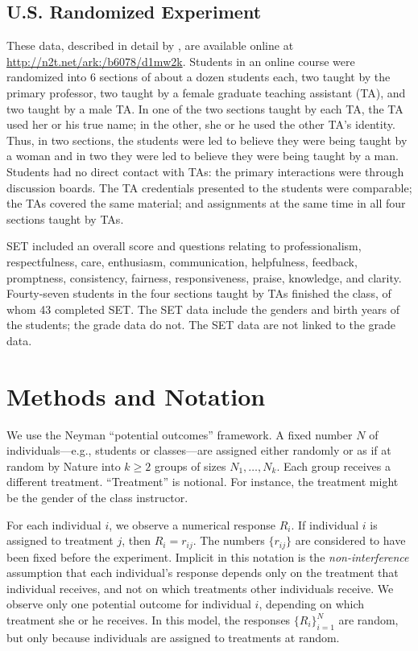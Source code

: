 \documentclass[12pt]{article}
\begin{document}
\subsection{U.S. Randomized Experiment}
These data, described in detail by \cite{MacNell2014}, are available online at 
\url{http://n2t.net/ark:/b6078/d1mw2k}.
Students in an online course were randomized into 6 sections of about a dozen students each, 
two taught by the primary professor,
two taught by a female graduate teaching assistant (TA), and two taught by a male TA.
In one of the two sections taught by each TA, the TA used her or his
true name; in the other, she or he used the other TA's identity.
Thus, in two sections, the students were led to believe they were being taught by a woman
and in two they were led to believe they were being taught by a man.
Students had no direct contact with TAs: the primary interactions were through
discussion boards.
The TA credentials presented to the students were comparable; the TAs covered
the same material; and assignments at the same time in all four sections taught by TAs.

SET included an overall score and questions relating to
professionalism, respectfulness, care, enthusiasm, communication, helpfulness,
feedback, promptness, consistency, fairness, responsiveness, praise, knowledge, 
and clarity.
Fourty-seven students in the four sections taught by TAs finished the class,
of whom 43 completed SET.
The SET data include the genders and birth years of the students; the grade data do not.
The SET data are not linked to the grade data.

\section{Methods and Notation} \label{sec:methods}

We use the Neyman ``potential outcomes'' framework.
A fixed number $N$ of individuals---e.g., students or classes---are assigned either
randomly or as if at random by Nature into 
$k \ge 2$ groups of sizes $N_1, \ldots, N_k$.
Each group receives a different treatment.
``Treatment'' is notional. 
For instance, the treatment might be the gender of the
class instructor.

For each individual $i$, we observe a numerical response $R_i$.
If individual $i$ is assigned to treatment $j$, then $R_i = r_{ij}$.
The numbers $\{r_{ij}\}$ are considered to have been fixed before the experiment.
Implicit in this notation is the \emph{non-interference} assumption that
each individual's response depends only on the treatment that individual receives, 
and not on which treatments other individuals receive.
We observe only one potential outcome for individual $i$, 
depending on which treatment she or he receives.
In this model, the responses $\{R_i\}_{i=1}^N$ are random, but only because individuals are 
assigned to treatments at random.
\end{document}
